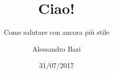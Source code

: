 \documentclass{beamer}
\title{Ciao!} %
\subtitle{Come salutare con ancora più stile}
\date{31/07/2017} %
\author{Alessandro Bari} %
\institute{Università degli studi di Padova}
\begin{document}
 \begin{frame} %
  \maketitle %
 \end{frame}
\end{document}
